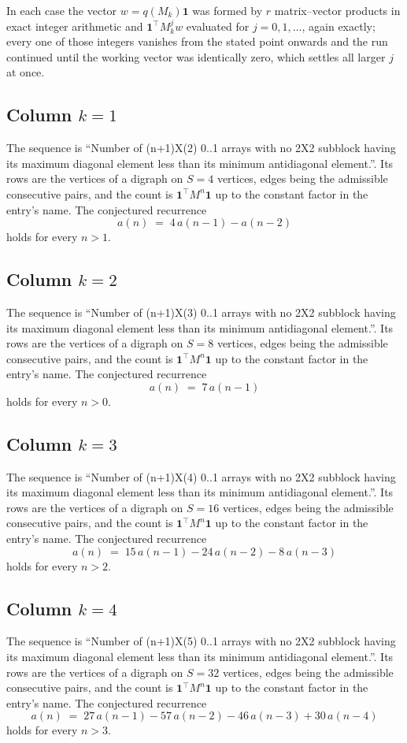 \documentclass[11pt,a4paper]{article}
\theoremstyle{plain}
\theoremstyle{definition}
\begin{document}
In each case the vector $w=q(M_k)\mathbf{1}$ was formed by $r$ matrix--vector products in
exact integer arithmetic and $\mathbf{1}^{\!\top}M_k^{j}w$ evaluated for $j=0,1,\dots$,
again exactly; every one of those integers vanishes from the stated point onwards and the run
continued until the working vector was identically zero, which settles all larger $j$ at once.

\subsection*{Column $k=1$}
The sequence is ``Number of (n+1)X(2) 0..1 arrays with no 2X2 subblock having its maximum diagonal element less than its minimum antidiagonal element.''. Its rows are the vertices of a digraph on
$S=4$ vertices, edges being the admissible consecutive pairs, and the count is
$\mathbf{1}^{\!\top}M^{n}\mathbf{1}$ up to the constant factor in the entry's name.
The conjectured recurrence
\[
a(n)\;=\;4\,a(n-1) - a(n-2)
\]
holds for every $n>1$.

\subsection*{Column $k=2$}
The sequence is ``Number of (n+1)X(3) 0..1 arrays with no 2X2 subblock having its maximum diagonal element less than its minimum antidiagonal element.''. Its rows are the vertices of a digraph on
$S=8$ vertices, edges being the admissible consecutive pairs, and the count is
$\mathbf{1}^{\!\top}M^{n}\mathbf{1}$ up to the constant factor in the entry's name.
The conjectured recurrence
\[
a(n)\;=\;7\,a(n-1)
\]
holds for every $n>0$.

\subsection*{Column $k=3$}
The sequence is ``Number of (n+1)X(4) 0..1 arrays with no 2X2 subblock having its maximum diagonal element less than its minimum antidiagonal element.''. Its rows are the vertices of a digraph on
$S=16$ vertices, edges being the admissible consecutive pairs, and the count is
$\mathbf{1}^{\!\top}M^{n}\mathbf{1}$ up to the constant factor in the entry's name.
The conjectured recurrence
\[
a(n)\;=\;15\,a(n-1) - 24\,a(n-2) - 8\,a(n-3)
\]
holds for every $n>2$.

\subsection*{Column $k=4$}
The sequence is ``Number of (n+1)X(5) 0..1 arrays with no 2X2 subblock having its maximum diagonal element less than its minimum antidiagonal element.''. Its rows are the vertices of a digraph on
$S=32$ vertices, edges being the admissible consecutive pairs, and the count is
$\mathbf{1}^{\!\top}M^{n}\mathbf{1}$ up to the constant factor in the entry's name.
The conjectured recurrence
\[
a(n)\;=\;27\,a(n-1) - 57\,a(n-2) - 46\,a(n-3) + 30\,a(n-4)
\]
holds for every $n>3$.
\end{document}
